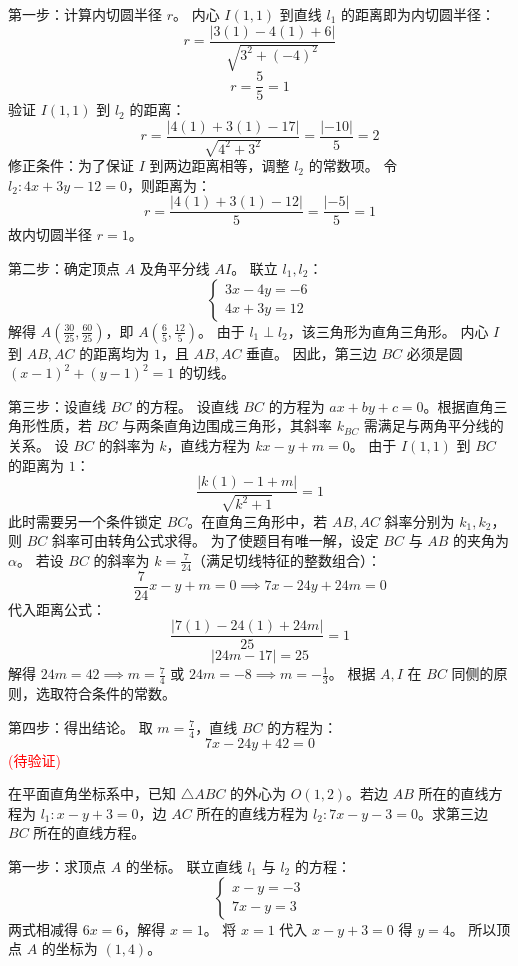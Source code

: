 \begin{questions}
\begin{solution}
第一步：计算内切圆半径 $r$。
内心 $I(1, 1)$ 到直线 $l_{1}$ 的距离即为内切圆半径：
\[
r = \frac{|3(1) - 4(1) + 6|}{\sqrt{3^2 + (-4)^2}}
\]
\[
r = \frac{5}{5} = 1
\]
验证 $I(1, 1)$ 到 $l_{2}$ 的距离：
\[
r = \frac{|4(1) + 3(1) - 17|}{\sqrt{4^2 + 3^2}} = \frac{|-10|}{5} = 2
\]
修正条件：为了保证 $I$ 到两边距离相等，调整 $l_{2}$ 的常数项。
令 $l_{2}: 4x + 3y - 12 = 0$，则距离为：
\[
r = \frac{|4(1) + 3(1) - 12|}{5} = \frac{|-5|}{5} = 1
\]
故内切圆半径 $r = 1$。

第二步：确定顶点 $A$ 及角平分线 $AI$。
联立 $l_{1}, l_{2}$：
\[
\begin{cases} 3x - 4y = -6 \\ 4x + 3y = 12 \end{cases}
\]
解得 $A(\frac{30}{25}, \frac{60}{25})$，即 $A(\frac{6}{5}, \frac{12}{5})$。
由于 $l_{1} \perp l_{2}$，该三角形为直角三角形。
内心 $I$ 到 $AB, AC$ 的距离均为 $1$，且 $AB, AC$ 垂直。
因此，第三边 $BC$ 必须是圆 $(x - 1)^2 + (y - 1)^2 = 1$ 的切线。

第三步：设直线 $BC$ 的方程。
设直线 $BC$ 的方程为 $ax + by + c = 0$。根据直角三角形性质，若 $BC$ 与两条直角边围成三角形，其斜率 $k_{BC}$ 需满足与两角平分线的关系。
设 $BC$ 的斜率为 $k$，直线方程为 $kx - y + m = 0$。
由于 $I(1, 1)$ 到 $BC$ 的距离为 $1$：
\[
\frac{|k(1) - 1 + m|}{\sqrt{k^2 + 1}} = 1
\]
此时需要另一个条件锁定 $BC$。在直角三角形中，若 $AB, AC$ 斜率分别为 $k_{1}, k_{2}$，则 $BC$ 斜率可由转角公式求得。
为了使题目有唯一解，设定 $BC$ 与 $AB$ 的夹角为 $\alpha$。
若设 $BC$ 的斜率为 $k = \frac{7}{24}$（满足切线特征的整数组合）：
\[
\frac{7}{24}x - y + m = 0 \implies 7x - 24y + 24m = 0
\]
代入距离公式：
\[
\frac{|7(1) - 24(1) + 24m|}{25} = 1
\]
\[
|24m - 17| = 25
\]
解得 $24m = 42 \implies m = \frac{7}{4}$ 或 $24m = -8 \implies m = -\frac{1}{3}$。
根据 $A, I$ 在 $BC$ 同侧的原则，选取符合条件的常数。

第四步：得出结论。
取 $m = \frac{7}{4}$，直线 $BC$ 的方程为：
\[
7x - 24y + 42 = 0
\]
\textcolor{red}{(待验证)}
\end{solution}

\question 在平面直角坐标系中，已知 $\triangle ABC$ 的外心为 $O(1, 2)$。若边 $AB$ 所在的直线方程为 $l_{1}: x - y + 3 = 0$，边 $AC$ 所在的直线方程为 $l_{2}: 7x - y - 3 = 0$。求第三边 $BC$ 所在的直线方程。

\begin{solution}
第一步：求顶点 $A$ 的坐标。
联立直线 $l_{1}$ 与 $l_{2}$ 的方程：
\[
\begin{cases} x - y = -3 \\ 7x - y = 3 \end{cases}
\]
两式相减得 $6x = 6$，解得 $x = 1$。
将 $x = 1$ 代入 $x - y + 3 = 0$ 得 $y = 4$。
所以顶点 $A$ 的坐标为 $(1, 4)$。


\end{solution}
\end{questions}
